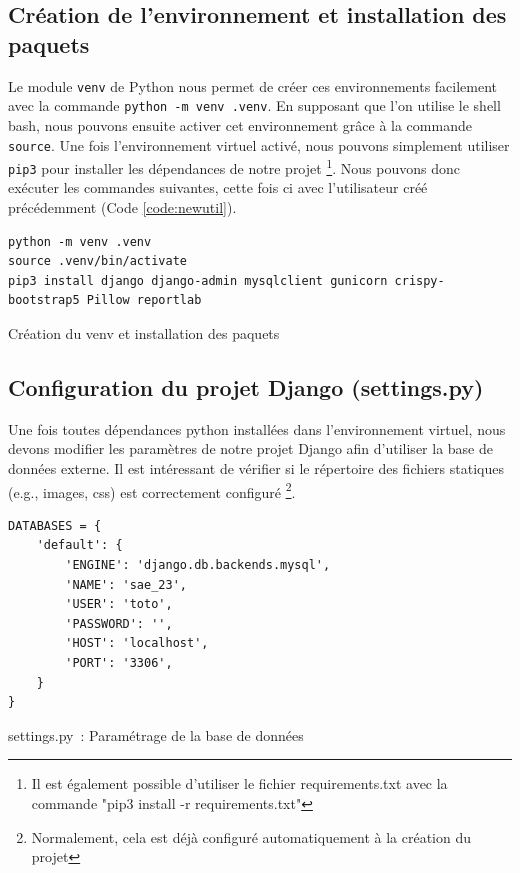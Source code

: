 \documentclass{article}
\begin{document}
        \subsection{Création de l'environnement et installation des paquets}
        Le module \verb|venv| de Python nous permet de créer ces environnements facilement avec la commande \verb|python -m venv .venv|.
        En supposant que l'on utilise le shell bash, nous pouvons ensuite activer cet environnement grâce à la commande \verb|source|.
        Une fois l'environnement virtuel activé, nous pouvons simplement utiliser \verb|pip3| pour installer les dépendances de notre projet
        \footnote{\label{note2}Il est également possible d'utiliser le fichier requirements.txt avec la commande "pip3 install -r requirements.txt"}. 
        Nous pouvons donc exécuter les commandes suivantes, cette fois ci avec l'utilisateur créé précédemment (Code \ref{code:newutil}). 
        \begin{listing}[H]
            \begin{verbatim}
python -m venv .venv
source .venv/bin/activate
pip3 install django django-admin mysqlclient gunicorn crispy-bootstrap5 Pillow reportlab
            \end{verbatim}
            \caption{Création du venv et installation des paquets}
            \label{code:creation-venv}
        \end{listing}
        
        \subsection{Configuration du projet Django (settings.py)}
        Une fois toutes dépendances python installées dans l'environnement virtuel, nous devons modifier les paramètres de notre projet Django afin d'utiliser la base de données externe.
        Il est intéressant de vérifier si le répertoire des fichiers statiques (e.g., images, css) est correctement configuré
        \footnote{\label{note3}Normalement, cela est déjà configuré automatiquement à la création du projet}. 
        \begin{listing}[H]
            \begin{verbatim}
DATABASES = {
    'default': {
        'ENGINE': 'django.db.backends.mysql',
        'NAME': 'sae_23',
        'USER': 'toto',
        'PASSWORD': '',
        'HOST': 'localhost',
        'PORT': '3306',
    }
}
            \end{verbatim}
            \caption{settings.py : Paramétrage de la base de données}
            \label{code:settings.py-db}
        \end{listing}
        
\end{document}
